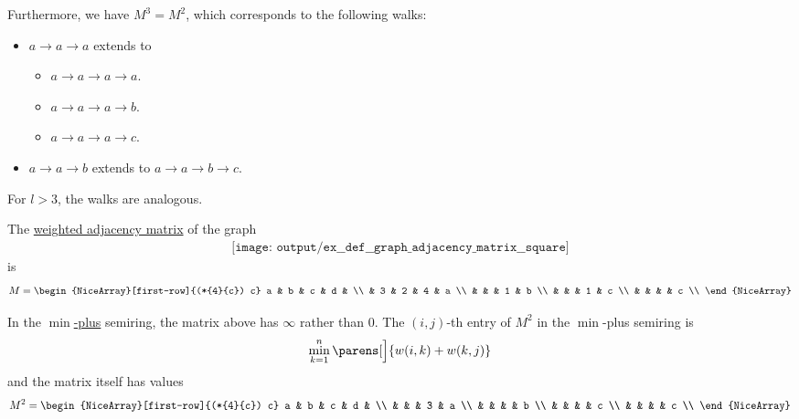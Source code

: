 \begin{example}
\begin{thmenum}
    Furthermore, we have \( M^3 = M^2 \), which corresponds to the following walks:
    \begin{itemize}
      \item \( a \to a \to a \) extends to
      \begin{itemize}
        \item \( a \to a \to a \to a \).
        \item \( a \to a \to a \to b \).
        \item \( a \to a \to a \to c \).
      \end{itemize}
      \item \( a \to a \to b \) extends to \( a \to a \to b \to c \).
    \end{itemize}

    For \( l > 3 \), the walks are analogous.

     The \hyperref[def:graph_adjacency_matrix]{weighted adjacency matrix} of the graph
    \begin{equation}\label{eq:ex:def:graph_adjacency_matrix/square/graph}
      \begin{aligned}
        \texttt{[image: output/ex\_\_def\_\_graph\_adjacency\_matrix\_\_square]}
      \end{aligned}
    \end{equation}
    is
    \begin{equation}\label{eq:ex:def:graph_adjacency_matrix/square/graph/matrix}
      M =
      \begin{NiceArray}[first-row]{(*{4}{c}) c}
        a & b & c & d &   \\
          & 3 & 2 & 4 & a \\
          &   &   & 1 & b \\
          &   &   & 1 & c \\
          &   &   &   & c \\
      \end{NiceArray}
    \end{equation}

    In the \hyperref[def:tropical_semiring]{\( \min \)-plus} semiring, the matrix above has \( \infty \) rather than \( 0 \). The \( (i, j) \)-th entry of \( M^2 \) in the \( \min \)-plus semiring is
    \begin{equation*}
      \min_{k=1}^n \parens[\Big]{ w(i,k) + w(k,j) }
    \end{equation*}
    and the matrix itself has values
    \begin{equation*}
      M^2 =
      \begin{NiceArray}[first-row]{(*{4}{c}) c}
        a & b & c & d &   \\
          &   &   & 3 & a \\
          &   &   &   & b \\
          &   &   &   & c \\
          &   &   &   & c \\
      \end{NiceArray}
    \end{equation*}


\end{thmenum}
\end{example}
